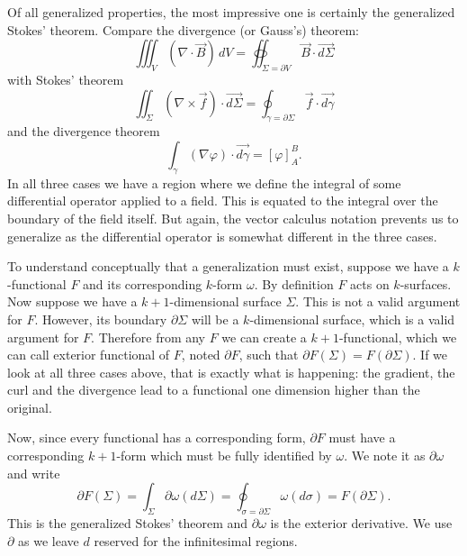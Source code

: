 \documentclass[10pt,twocolumn, nofootinbib]{revtex4-2}
\begin{document}
Of all generalized properties, the most impressive one is certainly the generalized Stokes' theorem. Compare the divergence (or Gauss's) theorem:
\begin{equation*}
	\iiint_V (\nabla \cdot \vec{B}) \, dV = \oiint_{\Sigma = \partial V} \vec{B} \cdot \vec{d\Sigma}
\end{equation*}
with Stokes' theorem
\begin{equation*}
	\iint_\Sigma (\nabla \times \vec{f}) \cdot \vec{d\Sigma} = \oint_{\gamma = \partial \Sigma} \vec{f} \cdot \vec{d\gamma}
\end{equation*}
and the divergence theorem
\begin{equation*}
	\int_\gamma (\nabla \varphi) \cdot \vec{d\gamma} = \left[ \varphi \right]_A^B .
\end{equation*}
In all three cases we have a region where we define the integral of some differential operator applied to a field. This is equated to the integral over the boundary of the field itself. But again, the vector calculus notation prevents us to generalize as the differential operator is somewhat different in the three cases.

To understand conceptually that a generalization must exist, suppose we have a $k$-functional $F$ and its corresponding $k$-form $\omega$. By definition $F$ acts on $k$-surfaces. Now suppose we have a $k+1$-dimensional surface $\Sigma$. This is not a valid argument for $F$. However, its boundary $\partial \Sigma$ will be a $k$-dimensional surface, which is a valid argument for $F$. Therefore from any $F$ we can create a $k+1$-functional, which we can call exterior functional of $F$, noted $\partial F$, such that $\partial F(\Sigma) = F(\partial \Sigma)$. If we look at all three cases above, that is exactly what is happening: the gradient, the curl and the divergence lead to a functional one dimension higher than the original.

Now, since every functional has a corresponding form, $\partial F$ must have a corresponding $k+1$-form which must be fully identified by $\omega$. We note it as $\partial \omega$ and write
\begin{equation*}
	\partial F(\Sigma) = \int_\Sigma \partial \omega(d\Sigma) = \oint_{\sigma = \partial \Sigma} \omega(d\sigma) = F(\partial \Sigma).
\end{equation*}
This is the generalized Stokes' theorem and $\partial \omega$ is the exterior derivative. We use $\partial$ as we leave $d$ reserved for the infinitesimal regions.
\end{document}
